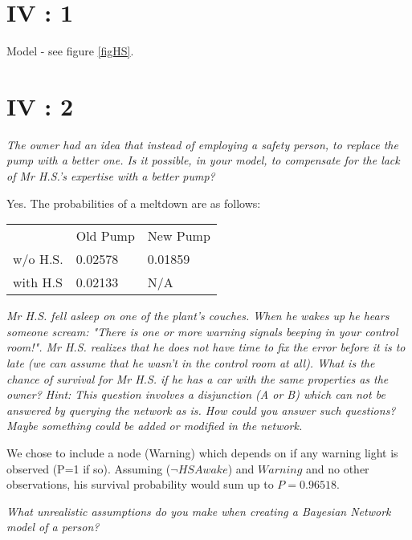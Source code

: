 \section{IV : 1}
Model - see figure \ref{figHS}.


\section{IV : 2}
\begin{framed}\em The owner had an idea that instead of employing a safety person, to replace the pump with a better one. Is it possible, in your model, to compensate for the lack of Mr H.S.'s expertise with a better pump?\em \end{framed}

Yes. The probabilities of a meltdown are as follows:

\begin{tabular}{l|l|l}
  & Old Pump & New Pump\\
  w/o H.S. & 0.02578 & 0.01859\\
  with H.S & 0.02133 & N/A
\end{tabular}
\vspace{.5cm}

\begin{framed}\em Mr H.S. fell asleep on one of the plant's couches. When he wakes up he hears someone scream: "There is one or more warning signals beeping in your control room!". Mr H.S. realizes that he does not have time to fix the error before it is to late (we can assume that he wasn't in the control room at all). What is the chance of survival for Mr H.S. if he has a car with the same properties as the owner? Hint: This question involves a disjunction (A or B) which can not be answered by querying the network as is. How could you answer such questions? Maybe something could be added or modified in the network.\em\end{framed}
\vspace{.5cm}

We chose to include a node (Warning) which depends on if any warning light is observed (P=1 if so). Assuming ($\neg HSAwake$) and $Warning$ and no other observations, his survival probability would sum up to $P=0.96518$.
\vspace{.5cm}

\begin{framed}\em What unrealistic assumptions do you make when creating a Bayesian Network model of a person?\em\end{framed}
\vspace{.5cm}

